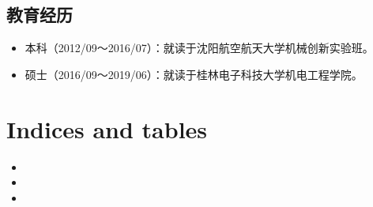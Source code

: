 \documentclass[letterpaper,10pt,english]{sphinxmanual}
\begin{document}
\section{教育经历}
\label{\detokenize{resume:id11}}\begin{itemize}
\item {} 
本科（2012/09～2016/07）：就读于沈阳航空航天大学机械创新实验班。

\item {} 
硕士（2016/09～2019/06）：就读于桂林电子科技大学机电工程学院。

\end{itemize}


\chapter{Indices and tables}
\label{\detokenize{index:indices-and-tables}}\begin{itemize}
\item {} 

\item {} 

\item {} 

\end{itemize}



\renewcommand{\indexname}{索引}
\printindex
\end{document}
